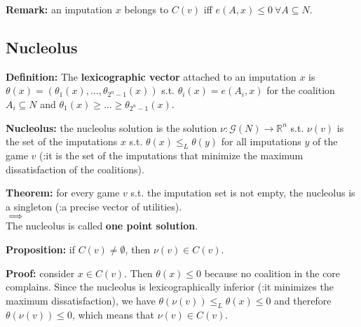 \bigskip
\noindent \textbf{Remark:} an imputation $x$ belongs to $C(v)$ iff $e(A,x) \leq 0 ~\forall A \subseteq N$.

\subsection{Nucleolus}

\noindent \textbf{Definition:} The \textbf{lexicographic vector} attached to an imputation $x$ is $\theta(x) = (\theta_1(x),...,\theta_{2^n-1}(x))$ s.t. $\theta_i(x) = e(A_i,x)$ for the coalition $A_i \subseteq N$ and $\theta_1(x) \geq ... \geq \theta_{2^n-1}(x)$.

\bigskip
\noindent \textbf{Nucleolus:} the nucleolus solution is the solution $\nu: \mathcal{G}(N) \rightarrow \mathbb{R}^n$ s.t. $\nu(v)$ is the set of the imputations $x$ s.t. $\theta(x) \leq_L \theta(y)$ for all imputations $y$ of the game $v$ (:it is the set of the imputations that minimize the maximum dissatisfaction of the coalitions).

\bigskip
\noindent \textbf{Theorem:} for every game $v$ s.t. the imputation set is not empty, the nucleolus is a singleton (:a precise vector of utilities).\\
$\implies$\\
The nucleolus is called \textbf{one point solution}.

\bigskip
\noindent \textbf{Proposition:} if $C(v) \neq \emptyset$, then $\nu(v) \in C(v)$.

\bigskip
\noindent \textbf{Proof:} consider $x \in C(v)$. Then $\theta(x) \leq 0$ because no coalition in the core complains. Since the nucleolus is lexicographically inferior (:it minimizes the maximum dissatisfaction), we have $\theta(\nu(v)) \leq_L \theta(x) \leq 0$ and therefore $\theta(\nu(v)) \leq 0$, which means that $\nu(v) \in C(v)$.

%
